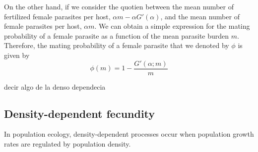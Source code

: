 \documentclass[12pt,a4paper]{article}
\theoremstyle{plain}%
\theoremstyle{definition}
\theoremstyle{remark}
\begin{document}
	On the other hand, 
	if we consider the quotien between
	the mean number of fertilized female parasites per host, $\alpha  m -\alpha  G'(\alpha)$, and the mean number of female parasites per host, $\alpha m$. 
	We can obtain a simple expression for the  mating probability of a female parasite as a function of the mean parasite burden $m$.   
	Therefore, the mating probability of a female parasite that we denoted by $\phi$ is given by
	\begin{equation}\label{probrepro1}
	\phi(m)%
	=1-\frac{G'(\alpha;m)}{m}
	\end{equation}
	
	{\color{blue} decir algo de la denso dependecia}
	\subsection{Density-dependent fecundity}
	In population ecology, density-dependent processes occur when population growth rates are regulated by population density.
	
\end{document}
